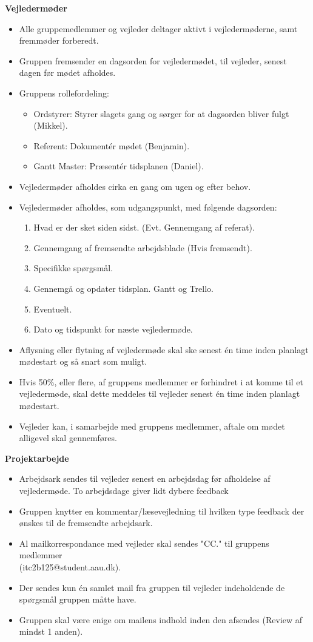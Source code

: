 \textbf{Vejledermøder}
\begin{itemize}
    \item Alle gruppemedlemmer og vejleder deltager aktivt i vejledermøderne, samt fremmøder forberedt.
    \item Gruppen fremsender en dagsorden for vejledermødet, til vejleder, senest dagen før mødet afholdes.
    \item Gruppens rollefordeling:
    \begin{itemize}
        \item Ordstyrer: Styrer slagets gang og sørger for at dagsorden bliver fulgt (Mikkel).
        \item Referent: Dokumentér mødet (Benjamin).
        \item Gantt Master: Præsentér tidsplanen (Daniel).
    \end{itemize}
    \item Vejledermøder afholdes cirka en gang om ugen og efter behov.
    \item Vejledermøder afholdes, som udgangspunkt, med følgende dagsorden:
    \begin{enumerate}
        \item Hvad er der sket siden sidst. (Evt. Gennemgang af referat).
        \item Gennemgang af fremsendte arbejdsblade (Hvis fremsendt).
        \item Specifikke spørgsmål.
        \item Gennemgå og opdater tidsplan. Gantt og Trello.
        \item Eventuelt.
        \item Dato og tidspunkt for næste vejledermøde.
    \end{enumerate}
    \item Aflysning eller flytning af vejledermøde skal ske senest én time inden planlagt mødestart og så snart som muligt.
    \item Hvis 50\%, eller flere, af gruppens medlemmer er forhindret i at komme til et vejledermøde, skal dette meddeles til vejleder senest én time inden planlagt mødestart.
    \item Vejleder kan, i samarbejde med gruppens medlemmer, aftale om mødet alligevel skal gennemføres.
\end{itemize}
\noindent
\textbf{Projektarbejde}
\begin{itemize}
    \item Arbejdsark sendes til vejleder senest en arbejdsdag før afholdelse af vejledermøde. To arbejdsdage giver lidt dybere feedback
    \item Gruppen knytter en kommentar/læsevejledning til hvilken type feedback der ønskes til de fremsendte arbejdsark.
    \item Al mailkorrespondance med vejleder skal sendes "CC." til gruppens medlemmer\\ (itc2b125@student.aau.dk).
    \item Der sendes kun én samlet mail fra gruppen til vejleder indeholdende de spørgsmål gruppen måtte have.
    \item Gruppen skal være enige om mailens indhold inden den afsendes (Review af mindst 1 anden).
\end{itemize}